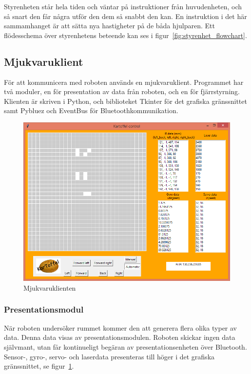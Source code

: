 \documentclass{article}
\begin{document}
Styrenheten står hela tiden och väntar på instruktioner från huvudenheten, och så snart den får några utför den dem så snabbt den kan. En instruktion i det här sammamhanget är att sätta nya hastigheter på de båda hjulparen. Ett flödesschema över styrenhetens beteende kan ses i figur~\ref{fig:styrenhet_flowchart}.

\subsection{Mjukvaruklient}
För att kommunicera med roboten används en mjukvaruklient. Programmet har två moduler, en för presentation av data från roboten, och en för fjärrstyrning. Klienten är skriven i Python, och biblioteket Tkinter för det grafiska gränssnittet samt Pybluez och EventBus för Bluetoothkommunikation. 

\begin{figure}[H]
\centering
\includegraphics[scale=0.55]{client1}
\caption{Mjukvaruklienten}
\label{fig:client1}
\end{figure}

\subsubsection{Presentationsmodul}
När roboten undersöker rummet kommer den att generera flera olika typer av data. Denna data visas av presentationsmodulen. Roboten skickar ingen data självmant, utan får kontinueligt begäran av presentationsenheten över Bluetooth. Sensor-, gyro-, servo- och laserdata presenteras till höger i det grafiska gränssnittet, se figur~\ref{fig:client1}.
\end{document}
